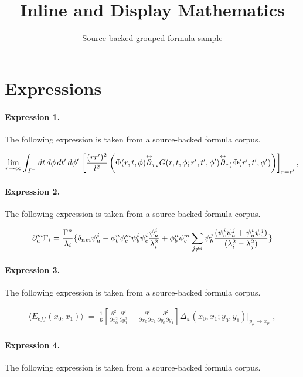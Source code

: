\documentclass[11pt]{article}
\title{Inline and Display Mathematics}
\author{Source-backed grouped formula sample}
\date{}
\begin{document}
\maketitle
\section{Expressions}
\paragraph{Expression 1.} The following expression is taken from a source-backed formula corpus.

\begin{align*}\lim_{r\to\infty}\int_{{\cal I}^-} dt\, d\phi\, dt'\, d\phi'\,\left[\frac{(rr')^2}{l^2}\left(\Phi(r,t,\phi){\buildrel \leftrightarrow \over \partial_{r_{\ast}}}G(r,t,\phi; r',t',\phi'){\buildrel \leftrightarrow \over \partial_{r'_{\ast}}}\Phi(r',t',\phi')\right)\right]_{r=r'}, \end{align*}

\paragraph{Expression 2.} The following expression is taken from a source-backed formula corpus.

\begin{align*}\partial^m_a \Gamma_i = \frac{\Gamma^n}{\lambda_i} \{\delta_{nm} \psi_a^i - \phi^n_b \phi^m_c \psi_b^i \psi_c^i \frac{\psi_a^i}{\lambda_i^2} + \phi^n_b \phi^m_c \sum_{j \neq i} \psi_b^j \frac{(\psi_c^i \psi_a^j + \psi_a^i \psi_c^j)} {(\lambda_i^2 - \lambda_j^2)}\}\vspace{-12pt}\end{align*}

\paragraph{Expression 3.} The following expression is taken from a source-backed formula corpus.

\begin{align*}\langle E_{eff}(x_0,x_1) \rangle \;=\; \frac{1}{6} \left[\frac{\partial^2}{\partial x_0^2}\frac{\partial^2}{\partial y_1^2} -\frac{\partial^2}{\partial x_0 \partial x_1} \frac{\partial^2}{\partial y_0 \partial y_1}\right] \Delta_\varphi(x_0,x_1;y_0, y_1)|_{y_\mu \to x_\mu} \;,\end{align*}

\paragraph{Expression 4.} The following expression is taken from a source-backed formula corpus.
\end{document}
